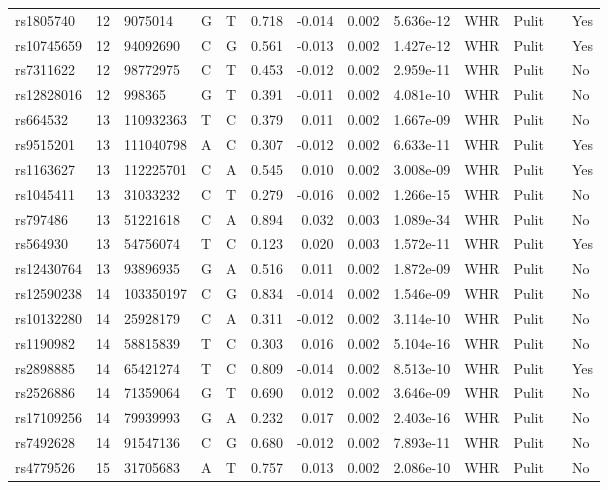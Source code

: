 \documentclass[11pt,twoside]{bristolthesis}
\begin{document}
\begin{longtable}[t]{lrlllrrrlllll}
rs1805740 & 12 & 9075014 & G & T & 0.718 & -0.014 & 0.002 & 5.636e-12 & WHR & Pulit &  & Yes\\
rs10745659 & 12 & 94092690 & C & G & 0.561 & -0.013 & 0.002 & 1.427e-12 & WHR & Pulit &  & Yes\\
\addlinespace
rs7311622 & 12 & 98772975 & C & T & 0.453 & -0.012 & 0.002 & 2.959e-11 & WHR & Pulit &  & No\\
rs12828016 & 12 & 998365 & G & T & 0.391 & -0.011 & 0.002 & 4.081e-10 & WHR & Pulit &  & No\\
rs664532 & 13 & 110932363 & T & C & 0.379 & 0.011 & 0.002 & 1.667e-09 & WHR & Pulit &  & No\\
rs9515201 & 13 & 111040798 & A & C & 0.307 & -0.012 & 0.002 & 6.633e-11 & WHR & Pulit &  & Yes\\
rs1163627 & 13 & 112225701 & C & A & 0.545 & 0.010 & 0.002 & 3.008e-09 & WHR & Pulit &  & Yes\\
\addlinespace
rs1045411 & 13 & 31033232 & C & T & 0.279 & -0.016 & 0.002 & 1.266e-15 & WHR & Pulit &  & No\\
rs797486 & 13 & 51221618 & C & A & 0.894 & 0.032 & 0.003 & 1.089e-34 & WHR & Pulit &  & No\\
rs564930 & 13 & 54756074 & T & C & 0.123 & 0.020 & 0.003 & 1.572e-11 & WHR & Pulit &  & Yes\\
rs12430764 & 13 & 93896935 & G & A & 0.516 & 0.011 & 0.002 & 1.872e-09 & WHR & Pulit &  & No\\
rs12590238 & 14 & 103350197 & C & G & 0.834 & -0.014 & 0.002 & 1.546e-09 & WHR & Pulit &  & No\\
\addlinespace
rs10132280 & 14 & 25928179 & C & A & 0.311 & -0.012 & 0.002 & 3.114e-10 & WHR & Pulit &  & No\\
rs1190982 & 14 & 58815839 & T & C & 0.303 & 0.016 & 0.002 & 5.104e-16 & WHR & Pulit &  & No\\
rs2898885 & 14 & 65421274 & T & C & 0.809 & -0.014 & 0.002 & 8.513e-10 & WHR & Pulit &  & Yes\\
rs2526886 & 14 & 71359064 & G & T & 0.690 & 0.012 & 0.002 & 3.646e-09 & WHR & Pulit &  & No\\
rs17109256 & 14 & 79939993 & G & A & 0.232 & 0.017 & 0.002 & 2.403e-16 & WHR & Pulit &  & No\\
\addlinespace
rs7492628 & 14 & 91547136 & C & G & 0.680 & -0.012 & 0.002 & 7.893e-11 & WHR & Pulit &  & No\\
rs4779526 & 15 & 31705683 & A & T & 0.757 & 0.013 & 0.002 & 2.086e-10 & WHR & Pulit &  & No\\

\end{longtable}
\end{document}
